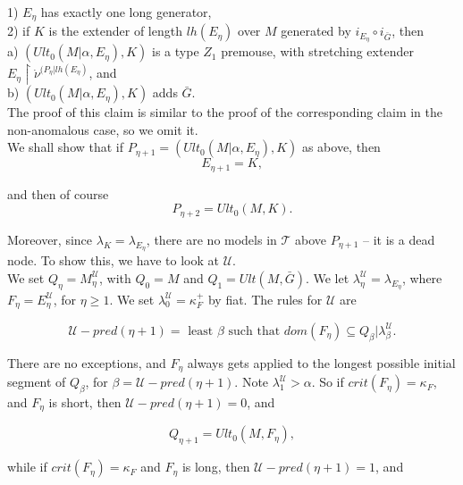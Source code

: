 \documentclass[12pt]{article}
\begin{document}
1) $E_\eta$ has exactly one long generator,\\

2) if $K$ is the extender of length $lh(E_\eta)$ over $M$ generated by $i_{E_\eta} \circ i_{\bar{G}}$, then\\

\indent \indent a) $(Ult_0 (M| \alpha , E_\eta), K)$ is a type $Z_1$ premouse, with stretching extender $E_\eta \restriction \dot{\nu}^{(P_\eta | lh (E_\eta)}$, and\\

\indent \indent b) $(Ult_0 (M | \alpha , E_\eta), K)$ adds $\bar{G}$.\\

The proof of this claim is similar to the proof of the corresponding claim in the non-anomalous case, so we omit it.\\

We shall show that if $P_{\eta + 1} = (Ult_0 (M | \alpha , E_\eta), K)$ as above, then\\

\[
E_{\eta + 1} = K,
\]

and then of course\\

\[
P_{\eta + 2} = Ult_0 (M , K).
\]

Moreover, since $\lambda_K = \lambda_{E_\eta}$, there are no models in $\mathscr{T}$ above $P_{\eta + 1}$ -- it is a dead node.  To show this, we have to look at $\mathscr{U}$.\\

We set $Q_\eta = M_{\eta}^{\mathscr{U}}$, with $Q_0 = M$ and $Q_1 = Ult(M, \bar{G})$.  We let $\lambda_\eta^{\mathscr{U}} = \lambda_{E_\eta}$, where $F_\eta = E_\eta^{\mathscr{U}}$, for $\eta \geq 1$.  We set $\lambda_0^{\mathscr{U}} = \kappa_F^+$ by fiat.  The rules for $\mathscr{U}$ are

\[
\mathscr{U}-pred (\eta + 1) = \text{ least $\beta$ such that } dom(F_\eta) \subseteq Q_\beta | \lambda_\beta^{\mathscr{U}}.
\]

There are no exceptions, and $F_\eta$ always gets applied to the longest possible initial segment of $Q_\beta$, for $\beta = \mathscr{U}-pred (\eta + 1)$.  Note $\lambda_1^{\mathscr{U}} > \alpha$.  So if $crit(F_\eta) = \kappa_F$, and $F_\eta$ is short, then $\mathscr{U}-pred (\eta + 1) = 0$, and

\[
Q_{\eta + 1} = Ult_0 (M, F_\eta),
\]

while if $crit(F_\eta) = \kappa_F$ and $F_\eta$ is long, then $\mathscr{U}-pred (\eta + 1) = 1$, and
\end{document}
